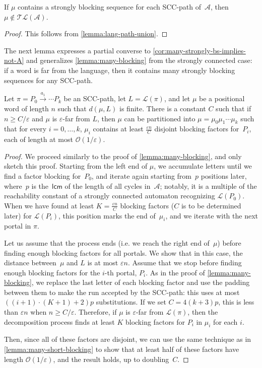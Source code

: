 \documentclass[letterpaper, USenglish, cleveref, autoref, thm-restate, numberwithinsect]{lipics-v2021}
\theoremstyle{theorem}
\theoremstyle{definition}
\newcommand{\Aa}{\mathcal{A}}
\newcommand{\cO}{\mathcal{O}}
\newcommand{\eps}{\varepsilon}
\newcommand{\lang}[1]{\mathcal{L}(#1)}
\newcommand{\lcm}{\mathsf{lcm}}
\newcommand{\SCCpath}{\pi}
\newcommand{\timedlang}[1]{\mathcal{TL}( #1 )}
\begin{document}
\begin{corollary}
	\label{cor:many-strongly-bs-implies-not-A}
	If $\mu$ contains a strongly blocking sequence for each SCC-path of~$\Aa$, then $\mu \notin \timedlang{\Aa}$.
\end{corollary}
\begin{proof}
	This follows from \cref{lemma:lang-path-union}.
\end{proof}

The next lemma expresses a partial converse to \cref{cor:many-strongly-bs-implies-not-A} and generalizes \cref{lemma:many-blocking} from the strongly connected case: if a word is far from the language, then it contains many strongly blocking sequences for any SCC-path.
\begin{lemma}
    \label{lem:far-from-path-implies-many-blocking}
    Let $\SCCpath  = P_0 \xrightarrow{a_1} \cdots  P_k$ be an SCC-path, let $L = \lang{\SCCpath}$, and let $\mu$ be a positional word of length $n$ such that $d(\mu, L)$ is finite.
    There is a constant $C$ such that if $n \geq C/\eps$
    and $\mu$ is $\eps$-far from $L$, then $\mu$ can be partitioned into $\mu = \mu_0\mu_1\cdots\mu_k$ such that for every $i = 0,\ldots, k$,
    $\mu_i$ contains at least $\frac{\eps n}{C}$ disjoint blocking factors for~$P_i$, each of length at most $\cO(1/\eps)$.
\end{lemma}
\begin{proof}
    We proceed similarly to the proof of \cref{lemma:many-blocking}, and only sketch this proof.
    Starting from the left end of $\mu$, we accumulate letters until we find a factor blocking for~$P_0$, and iterate again starting from~$p$ positions later, where~$p$ is the~$\lcm$ of the length of all cycles in~$\Aa$; notably, it is a multiple of the reachability constant of a strongly connected automaton recognizing $\lang{P_0}$. When we have found at least $K = \frac{\eps n}{C}$ blocking factors ($C$ is to be determined later) for $\lang{P_i}$, this position marks the end of~$\mu_i$, and we iterate with the next portal in $\SCCpath$.

    Let us assume that the process ends (i.e. we reach the right end of~$\mu$) before finding enough blocking factors for all portals. We show that in this case, the distance between~$\mu$ and $L$ is at most $\eps n$.
    Assume that we stop before finding enough blocking factors for the $i$-th portal, $P_i$.
    As in the proof of \cref{lemma:many-blocking}, we replace the last letter of each blocking factor and use the padding between them to make the run accepted by the SCC-path: this uses at most $((i+1)\cdot (K+1) + 2)p$ substitutions.
    If we set $C = 4(k+3)p$, this is less than $\eps n$ when $n \geq C/\eps$.
    Therefore, if $\mu$ is $\eps$-far from $\lang{\SCCpath}$, then the decomposition process finds at least $K$ blocking factors for $P_i$ in $\mu_i$ for each $i$.

    Then, since all of these factors are disjoint, we can use the same technique as in \cref{lemma:many-short-blocking} to show that at least half of these factors have length $\cO(1/\eps)$, and the result holds, up to doubling~$C$. 
\end{proof}
\end{document}
